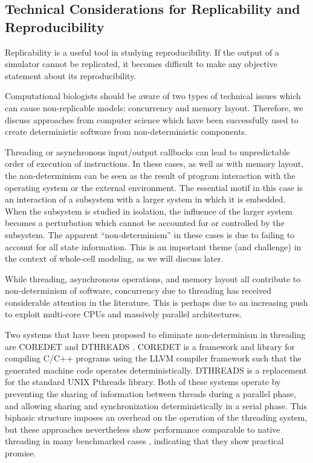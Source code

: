 \documentclass[journal,transmag,twoside]{IEEEtran}
\begin{document}
\subsection{Technical Considerations for Replicability and Reproducibility}

Replicability is a useful tool in studying reproducibility.
If the output of a simulator cannot be replicated, it becomes
difficult to make any objective statement about its reproducibility.

Computational biologists should be aware of two types of technical issues which 
can cause non-replicable models: concurrency and memory layout. 
Therefore, we discuss approaches from computer science which
have been successfully used to create deterministic software from non-deterministic components.

Threading or
asynchronous input/output callbacks can lead to unpredictable
order of execution of instructions.
In these cases, as well as with memory layout,
the non-determinism
can be seen as the result
of program interaction with the operating system or the external environment.
The essential motif in this case is an interaction of a subsystem
with a larger system in which it is embedded.
When the subsystem is studied in isolation, the influence of the larger
system becomes a perturbation which cannot be accounted for or controlled by
the subsystem. The apparent ``non-determinism'' in these cases
is due to failing to account for all state information.
This is an important theme (and challenge) in the context of whole-cell modeling,
as we will discuss later. %

While threading, asynchronous operations, and memory layout all contribute
to non-determinism of software,
concurrency due to threading has received considerable attention in the literature.
This is perhaps due to an increasing push to exploit multi-core CPUs
and massively parallel architectures.

Two systems that have been proposed to eliminate non-determinism in threading
are C{\small ORE}D{\small ET} \cite{bergan2010coredet} and D{\small THREADS} \cite{liu2011dthreads}.
C{\small ORE}D{\small ET} is a framework and library for compiling C/C++ programs
using the LLVM compiler framework such that the generated machine code operates deterministically.
D{\small THREADS} is a replacement for the standard UNIX Pthreads library.
Both of these systems operate by preventing the sharing of information between
threads during a parallel phase, and allowing sharing and synchronization
deterministically in a serial phase.
This biphasic structure imposes an overhead on the operation of the threading
system, but these approaches nevertheless show performance comparable to native
threading in many benchmarked cases \cite{liu2011dthreads}, indicating that they show
practical promise.
\end{document}
